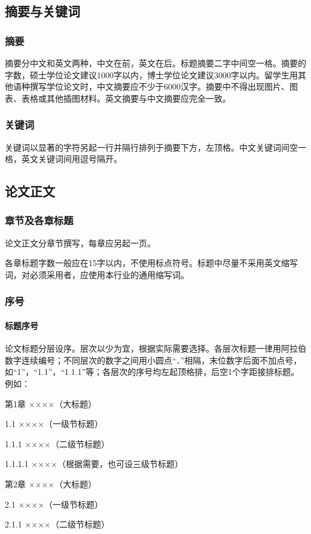 \subsection{摘要与关键词}
\subsubsection{摘要}
摘要分中文和英文两种，中文在前，英文在后。标题摘要二字中间空一格。摘要的字数，硕士学位论文建议1000字以内，博士学位论文建议3000字以内。留学生用其他语种撰写学位论文时，中文摘要应不少于6000汉字。摘要中不得出现图片、图表、表格或其他插图材料。英文摘要与中文摘要应完全一致。
\subsubsection{关键词}
关键词以显著的字符另起一行并隔行排列于摘要下方，左顶格。中文关键词间空一格，英文关键词间用逗号隔开。

\subsection{论文正文}
\subsubsection{章节及各章标题}
论文正文分章节撰写，每章应另起一页。

各章标题字数一般应在15字以内，不使用标点符号。标题中尽量不采用英文缩写词，对必须采用者，应使用本行业的通用缩写词。
\subsubsection{序号}
\paragraph{标题序号}
论文标题分层设序。层次以少为宜，根据实际需要选择。各层次标题一律用阿拉伯数字连续编号；不同层次的数字之间用小圆点“．”相隔，末位数字后面不加点号，如“1”，“1.1”，“1.1.1”等；各层次的序号均左起顶格排，后空1个字距接排标题。例如：

第1章 ××××（大标题）

1.1 ××××（一级节标题）

1.1.1 ××××（二级节标题）

1.1.1.1 ××××（根据需要，也可设三级节标题）

第2章 ××××（大标题）

2.1 ××××（一级节标题）

2.1.1 ××××（二级节标题）

